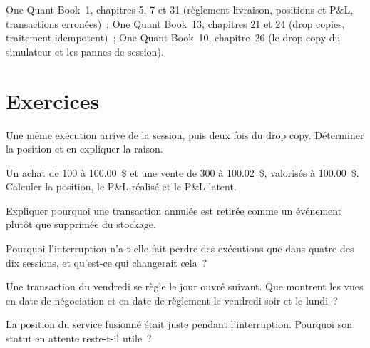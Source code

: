 \begin{omsources}
\item One Quant Book~1, chapitres 5, 7 et 31 (règlement-livraison, positions et P\&L, transactions erronées)~; One Quant Book~13, chapitres 21 et 24 (drop
copies, traitement idempotent)~; One Quant Book~10, chapitre~26 (le drop copy du simulateur et les pannes de session).
\end{omsources}

\section{Exercices}

\begin{exercise}[$\star$]\label{exo:pl:position-and-pnl-services:1}
Une même exécution arrive de la session, puis deux fois du drop copy. Déterminer la position et en expliquer la raison.
\end{exercise}

\begin{exercise}[$\star$]\label{exo:pl:position-and-pnl-services:2}
Un achat de 100 à 100.00~\$ et une vente de 300 à 100.02~\$, valorisés à 100.00~\$. Calculer la position, le P\&L réalisé et le P\&L latent.
\end{exercise}

\begin{exercise}[$\star$]\label{exo:pl:position-and-pnl-services:3}
Expliquer pourquoi une transaction annulée est retirée comme un événement plutôt que supprimée du stockage.
\end{exercise}

\begin{exercise}[$\star\star$]\label{exo:pl:position-and-pnl-services:4}
Pourquoi l'interruption n'a-t-elle fait perdre des exécutions que dans quatre des dix sessions, et qu'est-ce qui changerait cela~?
\end{exercise}

\begin{exercise}[$\star\star$]\label{exo:pl:position-and-pnl-services:5}
Une transaction du vendredi se règle le jour ouvré suivant. Que montrent les vues en date de négociation et en date de règlement le vendredi soir et le lundi~?
\end{exercise}

\begin{exercise}[$\star\star$]\label{exo:pl:position-and-pnl-services:6}
La position du service fusionné était juste pendant l'interruption. Pourquoi son statut en attente reste-t-il utile~?
\end{exercise}


